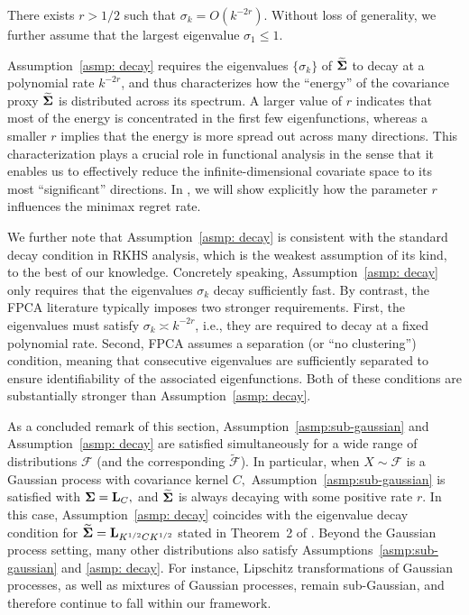 \documentclass[mnsc]{informs3aa} %
\renewcommand{\tilde}{\widetilde}
\newcommand{\bSigma}{\bold{\Sigma}}
\newcommand{\bL}{\bold L}
\newcommand{\mF}{\mathcal F}
\renewcommand{\tilde}{\widetilde}
\renewcommand{\tilde}{\widetilde}
\begin{document}
\begin{assumption}\label{asmp: decay}
	There exists $r>1/2$ such that $\sigma_k=O(k^{-2r}).$ Without loss of generality, we further assume that the largest eigenvalue $\sigma_1\leq 1.$
\end{assumption}

Assumption~\ref{asmp: decay} requires the eigenvalues $\{\sigma_k\}$ of $\tilde{\bSigma}$ to decay at a polynomial rate $k^{-2r}$, and thus characterizes how the ``energy'' of the covariance proxy $\tilde{\bSigma}$ is distributed across its spectrum. A larger value of $r$ indicates that most of the energy is concentrated in the first few eigenfunctions, whereas a smaller $r$ implies that the energy is more spread out across many directions. This characterization plays a crucial role in functional analysis in the sense that it enables us to effectively reduce the infinite-dimensional covariate space to its most ``significant'' directions.  In , we will show explicitly how the parameter $r$ influences the minimax regret rate.

We further note that Assumption~\ref{asmp: decay} is consistent with the standard decay condition in RKHS analysis, which is the weakest assumption of its kind, to the best of our knowledge. Concretely speaking, Assumption~\ref{asmp: decay} only requires that the eigenvalues $\sigma_k$ decay sufficiently fast.  By contrast, the FPCA literature typically imposes two stronger requirements. First, the eigenvalues must satisfy $\sigma_k \asymp k^{-2r}$, i.e., they are required to decay at a fixed polynomial rate. Second, FPCA assumes a separation (or ``no clustering'') condition, meaning that consecutive eigenvalues are sufficiently separated to ensure identifiability of the associated eigenfunctions. Both of these conditions are substantially stronger than Assumption~\ref{asmp: decay}.

As a concluded remark of this section,
Assumption~\ref{asmp:sub-gaussian} and Assumption~\ref{asmp: decay} are satisfied simultaneously for a wide range of distributions $\mF$ (and the corresponding $\tilde{\mF}$).
In particular, when $X\sim\mF$ is a Gaussian process with covariance kernel $C,$ Assumption~\ref{asmp:sub-gaussian} is satisfied with $\bSigma=\bL_{C},$ and $\tilde{\bSigma}$ is always decaying with some positive rate $r.$ In this case, Assumption~\ref{asmp: decay} coincides with the eigenvalue decay condition for $\tilde{\bSigma}=\bL_{K^{1/2}CK^{1/2}}$ stated in Theorem~2 of \cite{cai2012minimax}. Beyond the Gaussian process setting, many other distributions also satisfy Assumptions~\ref{asmp:sub-gaussian} and \ref{asmp: decay}. For instance, Lipschitz transformations of Gaussian processes, as well as mixtures of Gaussian processes, remain sub-Gaussian, and therefore continue to fall within our framework.
\end{document}
